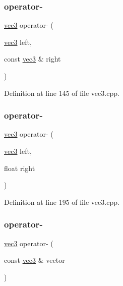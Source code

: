 \subsubsection{\texorpdfstring{operator-\/}{operator-}\hspace{0.1cm}{\footnotesize\ttfamily [1/3]}}
{\footnotesize\ttfamily \hyperlink{structspork_1_1maths_1_1vec3}{vec3} operator-\/ (\begin{DoxyParamCaption}\item[{\hyperlink{structspork_1_1maths_1_1vec3}{vec3}}]{left,  }\item[{const \hyperlink{structspork_1_1maths_1_1vec3}{vec3} \&}]{right }\end{DoxyParamCaption})\hspace{0.3cm}{\ttfamily [friend]}}



Definition at line 145 of file vec3.\+cpp.

\mbox{\label{structspork_1_1maths_1_1vec3_a70bc79f524ca840d9ba49a8e8492a292}} 
\subsubsection{\texorpdfstring{operator-\/}{operator-}\hspace{0.1cm}{\footnotesize\ttfamily [2/3]}}
{\footnotesize\ttfamily \hyperlink{structspork_1_1maths_1_1vec3}{vec3} operator-\/ (\begin{DoxyParamCaption}\item[{\hyperlink{structspork_1_1maths_1_1vec3}{vec3}}]{left,  }\item[{float}]{right }\end{DoxyParamCaption})\hspace{0.3cm}{\ttfamily [friend]}}



Definition at line 195 of file vec3.\+cpp.

\mbox{\label{structspork_1_1maths_1_1vec3_aeb9e3850f1202f9e51cc869dcf3a62b7}} 
\subsubsection{\texorpdfstring{operator-\/}{operator-}\hspace{0.1cm}{\footnotesize\ttfamily [3/3]}}
{\footnotesize\ttfamily \hyperlink{structspork_1_1maths_1_1vec3}{vec3} operator-\/ (\begin{DoxyParamCaption}\item[{const \hyperlink{structspork_1_1maths_1_1vec3}{vec3} \&}]{vector }\end{DoxyParamCaption})\hspace{0.3cm}{\ttfamily [friend]}}



